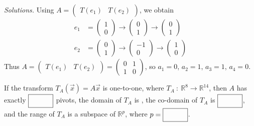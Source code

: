     \ifnum {} {\color{DarkBlue} \textit{Solutions.} 
    Using $A = \begin{pmatrix} T(e_1) & T(e_2) \end{pmatrix}$, we obtain
    \begin{align}
        e_1 &= \begin{pmatrix} 1\\0 \end{pmatrix} \to \begin{pmatrix}0\\1 \end{pmatrix} \to \begin{pmatrix}0\\1 \end{pmatrix} \\
        e_2 &= \begin{pmatrix} 0 \\1 \end{pmatrix} \to \begin{pmatrix} -1\\0 \end{pmatrix} \to \begin{pmatrix}1\\0 \end{pmatrix}
    \end{align}
    Thus $A = \begin{pmatrix} T(e_1) & T(e_2) \end{pmatrix} = \begin{pmatrix} 0 & 1\\1 & 0\end{pmatrix}$, so $a_1=0$, $a_2=1$, $a_3=1$, $a_4=0$. 
    } 
    \else
    \fi        
\fi 


\ifnum {}
        If the transform $T_A(\vec x) = A\vec x$ is one-to-one, where $T_A \ : \ \mathbb R^{8} \to \mathbb R^{14}$, then $A$ has exactly $\framebox{\strut\hspace{1.00cm}}$ pivots, the domain of $T_A$ is \framebox{\strut\hspace{1.00cm}}, the co-domain of $T_A$ is $\framebox{\strut\hspace{1.00cm}}$, and the range of $T_A$ is a subspace of $\mathbb R^p$, where $p = \framebox{\strut\hspace{1.00cm}}$. 
        
